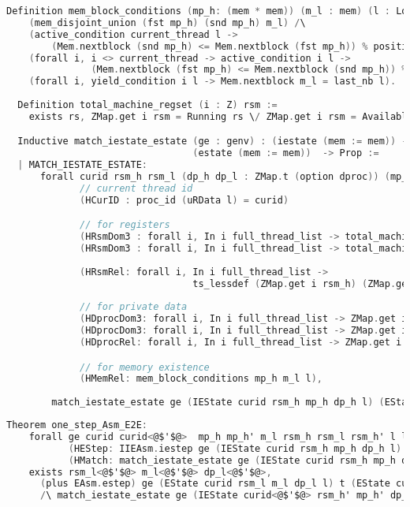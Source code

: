 \begin{lstlisting}[language=C]
  Definition mem_block_conditions (mp_h: (mem * mem)) (m_l : mem) (l : Log) : Prop :=
    (mem_disjoint_union (fst mp_h) (snd mp_h) m_l) /\
    (active_condition current_thread l -> 
        (Mem.nextblock (snd mp_h) <= Mem.nextblock (fst mp_h)) % positive) /\
    (forall i, i <> current_thread -> active_condition i l -> 
               (Mem.nextblock (fst mp_h) <= Mem.nextblock (snd mp_h)) % positive) /\
    (forall i, yield_condition i l -> Mem.nextblock m_l = last_nb l).
  
  Definition total_machine_regset (i : Z) rsm :=
    exists rs, ZMap.get i rsm = Running rs \/ ZMap.get i rsm = Available.

  Inductive match_iestate_estate (ge : genv) : (iestate (mem := mem)) -> 
                                 (estate (mem := mem))  -> Prop :=  
  | MATCH_IESTATE_ESTATE:
      forall curid rsm_h rsm_l (dp_h dp_l : ZMap.t (option dproc)) (mp_h: (mem * mem)) m_l l
             // current thread id 
             (HCurID : proc_id (uRData l) = curid)

             // for registers 
             (HRsmDom3 : forall i, In i full_thread_list -> total_machine_regset i rsm_h)
             (HRsmDom3 : forall i, In i full_thread_list -> total_machine_regset i rsm_l)
             
             (HRsmRel: forall i, In i full_thread_list ->
                                 ts_lessdef (ZMap.get i rsm_h) (ZMap.get i rsm_l))
             
             // for private data 
             (HDprocDom3: forall i, In i full_thread_list -> ZMap.get i dp_h <> None)
             (HDprocDom3: forall i, In i full_thread_list -> ZMap.get i dp_l <> None)
             (HDprocRel: forall i, In i full_thread_list -> ZMap.get i dp_h = ZMap.get i dp_l)

             // for memory existence 
             (HMemRel: mem_block_conditions mp_h m_l l),
        
        match_iestate_estate ge (IEState curid rsm_h mp_h dp_h l) (EState curid rsm_l m_l dp_l l).
\end{lstlisting}

\begin{lstlisting}[language=C]
  Theorem one_step_Asm_E2E:
    forall ge curid curid<@$'$@>  mp_h mp_h' m_l rsm_h rsm_l rsm_h' l l<@$'$@> (dp_h dp_l dp_h' : ZMap.t (option dproc)) t
           (HEStep: IIEAsm.iestep ge (IEState curid rsm_h mp_h dp_h l) t (IEState curid<@$'$@> rsm_h' mp_h' dp_h' l<@$'$@>))
           (HMatch: match_iestate_estate ge (IEState curid rsm_h mp_h dp_h l) (EState curid rsm_l m_l dp_l l)),
    exists rsm_l<@$'$@> m_l<@$'$@> dp_l<@$'$@>,
      (plus EAsm.estep) ge (EState curid rsm_l m_l dp_l l) t (EState curid<@$'$@> rsm_l<@$'$@> m_l<@$'$@> dp_l<@$'$@> l<@$'$@>)
      /\ match_iestate_estate ge (IEState curid<@$'$@> rsm_h' mp_h' dp_h' l<@$'$@>) (EState curid<@$'$@> rsm_l<@$'$@> m_l<@$'$@> dp_l<@$'$@> l<@$'$@>).
\end{lstlisting}


